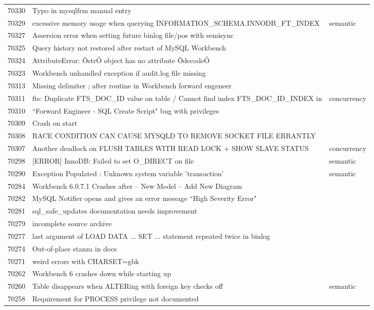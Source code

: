 \begin{longtable}[c]{p{1cm}p{8cm}p{3cm}}
70330 & Typo in mysqlfrm manual entry &  \\
70329 & excessive memory usage when querying INFORMATION\_SCHEMA.INNODB\_FT\_INDEX & semantic \\
70327 & Assersion error when setting future binlog file/pos with semisync &  \\
70325 & Query history not restored after restart of MySQL Workbench &  \\
70324 & AttributeError: ÔstrŐ object has no attribute ÔdecodeŐ &  \\
70323 & Workbench unhandled exception if audit.log file missing &  \\
70313 & Missing delimiter ; after routine in Workbench forward engeneer &  \\
70311 & fts: Duplicate FTS\_DOC\_ID value on table / Cannot find index FTS\_DOC\_ID\_INDEX in & concurrency \\
70310 & ``Forward Engineer - SQL Create Script" bug with privileges &  \\
70309 & Crash on start &  \\
70308 & RACE CONDITION CAN CAUSE MYSQLD TO REMOVE SOCKET FILE ERRANTLY &  \\
70307 & Another deadlock on FLUSH TABLES WITH READ LOCK + SHOW SLAVE STATUS & concurrency \\
70298 & {[}ERROR{]} InnoDB: Failed to set O\_DIRECT on file & semantic \\
70290 & Exception Populated : Unknown system variable 'transaction' & semantic \\
70284 & Workbench 6.0.7.1 Crashes after -- New Model -- Add New Diagram &  \\
70282 & MySQL Notifier opens and gives an error message ``High Severity Error" &  \\
70281 & sql\_safe\_updates documentation needs improvement &  \\
70279 & incomplete source archive &  \\
70277 & last argument of LOAD DATA ... SET ... statement repeated twice in binlog &  \\
70274 & Out-of-place stanza in docs &  \\
70271 & weird errors with CHARSET=gbk &  \\
70262 & Workbench 6 crashes down while starting up &  \\
70260 & Table disappears when ALTERing with foreign key checks off & semantic \\
70258 & Requirement for PROCESS privilege not documented &  \\

\end{longtable}
